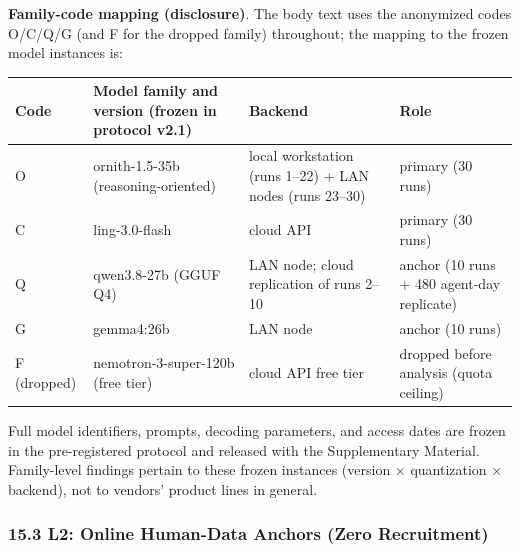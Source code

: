 \documentclass[
  11pt]{article}
\begin{document}
\textbf{Family-code mapping (disclosure)}. The body text uses the
anonymized codes O/C/Q/G (and F for the dropped family) throughout; the
mapping to the frozen model instances is:

\begin{longtable}[]{@{}
  >{\raggedright\arraybackslash}p{}
  >{\raggedright\arraybackslash}p{}
  >{\raggedright\arraybackslash}p{}
  >{\raggedright\arraybackslash}p{}@{}}
\toprule\noalign{}
\begin{minipage}[b]{\linewidth}\raggedright
Code
\end{minipage} & \begin{minipage}[b]{\linewidth}\raggedright
Model family and version (frozen in protocol v2.1)
\end{minipage} & \begin{minipage}[b]{\linewidth}\raggedright
Backend
\end{minipage} & \begin{minipage}[b]{\linewidth}\raggedright
Role
\end{minipage} \\
\midrule\noalign{}
\endhead
\bottomrule\noalign{}
\endlastfoot
O & ornith-1.5-35b (reasoning-oriented) & local workstation (runs 1--22)
+ LAN nodes (runs 23--30) & primary (30 runs) \\
C & ling-3.0-flash & cloud API & primary (30 runs) \\
Q & qwen3.8-27b (GGUF Q4) & LAN node; cloud replication of runs 2--10 &
anchor (10 runs + 480 agent-day replicate) \\
G & gemma4:26b & LAN node & anchor (10 runs) \\
F (dropped) & nemotron-3-super-120b (free tier) & cloud API free tier &
dropped before analysis (quota ceiling) \\
\end{longtable}

Full model identifiers, prompts, decoding parameters, and access dates
are frozen in the pre-registered protocol and released with the
Supplementary Material. Family-level findings pertain to these frozen
instances (version × quantization × backend), not to vendors' product
lines in general.

\subsubsection{15.3 L2: Online Human-Data Anchors (Zero
Recruitment)}\label{l2-online-human-data-anchors-zero-recruitment}
\end{document}
